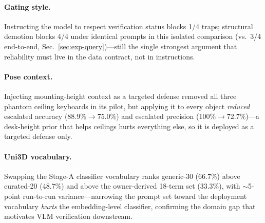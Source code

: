 \paragraph{Gating style.}
Instructing the model to respect verification status blocks 1/4 traps;
structural demotion blocks 4/4 under identical prompts in this isolated
comparison (vs.\ 3/4 end-to-end, Sec.~\ref{sec:exp-query})---still the
single strongest argument that
reliability must live in the data contract, not in instructions.

\paragraph{Pose context.}
Injecting mounting-height context as a
targeted defense removed all three phantom ceiling keyboards in its pilot,
but applying it to every object \emph{reduced} escalated accuracy
(88.9\%$\rightarrow$75.0\%) and escalated precision
(100\%$\rightarrow$72.7\%)---a desk-height prior that helps ceilings hurts
everything else, so it is deployed as a targeted defense only.

\paragraph{Uni3D vocabulary.}
Swapping the Stage-A classifier vocabulary ranks generic-30 (66.7\%) above
curated-20 (48.7\%) and above the owner-derived 18-term set (33.3\%), with
$\sim$5-point run-to-run variance---narrowing the prompt set toward the
deployment vocabulary \emph{hurts} the embedding-level classifier,
confirming the domain gap that motivates VLM verification downstream.

